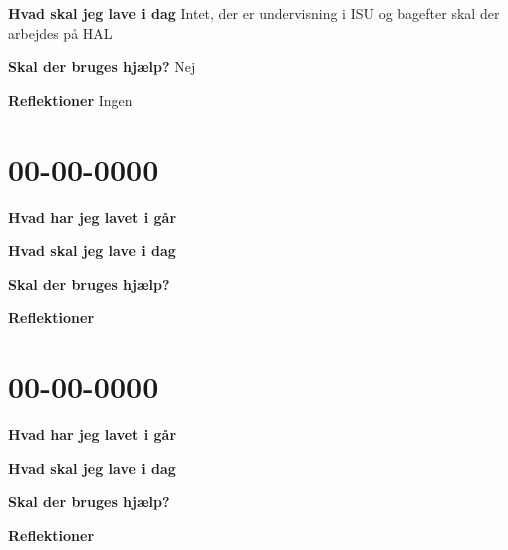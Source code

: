 \documentclass{article}
\begin{document}
	\textbf{Hvad skal jeg lave i dag} Intet, der er undervisning i ISU og bagefter skal der arbejdes på HAL
	
	\textbf{Skal der bruges hjælp?} Nej
	
	\textbf{Reflektioner} Ingen
	
	\section{00-00-0000}
	
	\textbf{Hvad har jeg lavet i går} 
	
	\textbf{Hvad skal jeg lave i dag} 
	
	\textbf{Skal der bruges hjælp?}
	
	\textbf{Reflektioner}
	
	\section{00-00-0000}
	
	\textbf{Hvad har jeg lavet i går} 
	
	\textbf{Hvad skal jeg lave i dag} 
	
	\textbf{Skal der bruges hjælp?}
	
	\textbf{Reflektioner}
		
\end{document}
